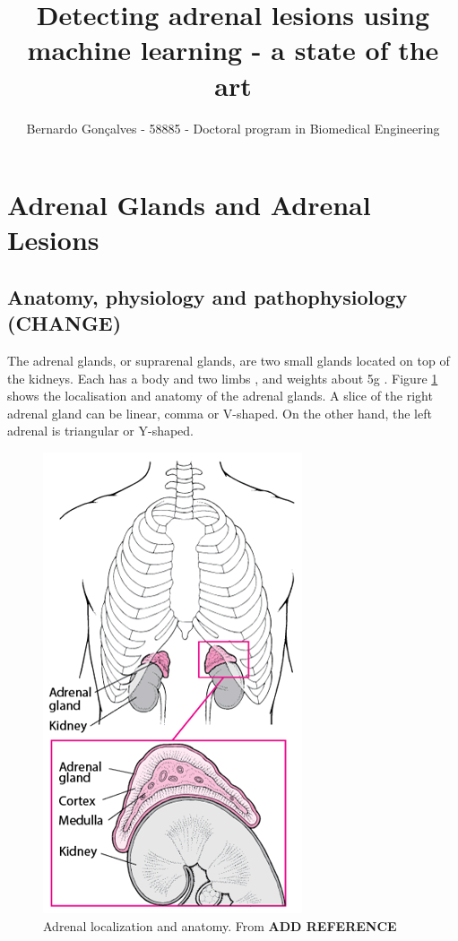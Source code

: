 \documentclass{article}
\title{Detecting adrenal lesions using machine learning - a state of the art}
\author{Bernardo Gonçalves - 58885 - Doctoral program in Biomedical Engineering}
\begin{document}
\maketitle

\section{Adrenal Glands and Adrenal Lesions}

\subsection{Anatomy, physiology and pathophysiology (CHANGE)}

The adrenal glands, or suprarenal glands, are two small glands located on top of the kidneys.  Each has a body and two limbs \cite{Baba2012}, and weights about 5g \cite{brit}. Figure \ref{fig:adrenal_ana} shows the localisation and anatomy of the adrenal glands. A slice of the right adrenal gland can be linear, comma or V-shaped. On the other hand, the left adrenal is triangular or Y-shaped.

\begin{figure}
    \centering
    \includegraphics[scale=0.6]{figures/adrenal_anatomy.png}
    \caption{Adrenal localization and anatomy. From \textbf{ADD REFERENCE}}
    \label{fig:adrenal_ana}
\end{figure}
\end{document}
